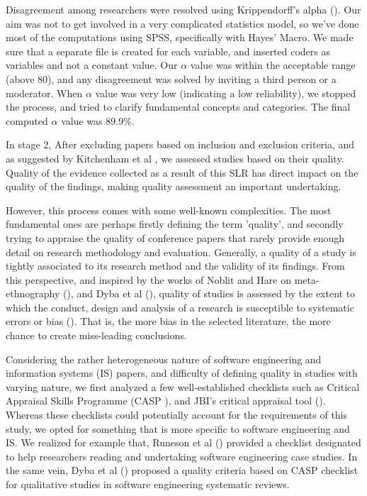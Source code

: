 \documentclass{ieeeaccess}
\begin{document}
Disagreement among researchers were resolved using Krippendorff’s alpha (\cite{krippendorff2011computing}). Our aim was not to get involved in a very complicated statistics model, so we've done most of the computations using SPSS, specifically with Hayes’ Macro. We made sure that a separate file is created for each variable, and inserted coders as variables and not a constant value. Our $ \alpha $ value was within the acceptable range (above 80), and any disagreement was solved by inviting a third person or a moderator. When $ \alpha $ value was very low (indicating a low reliability), we stopped the process, and tried to clarify fundamental concepts and categories. The final computed $ \alpha $ value was 89.9\%. 

In stage 2, After excluding papers based on inclusion and exclusion criteria, and as suggested by Kitchenham et al \cite{kitchenham2015evidence}, we assessed studies based on their quality. Quality of the evidence collected as a result of this SLR has direct impact on the quality of the findings, making quality assessment an important undertaking.

However, this process comes with some well-known complexities. The most fundamental ones are perhaps firstly defining the term 'quality', and secondly trying to appraise the quality of conference papers that rarely provide enough detail on research methodology and evaluation. Generally, a quality of a study is tightly associated to its research method and the validity of its findings. From this perspective, and inspired by the works of Noblit and Hare on meta-ethnography (\cite{noblit1988meta}), and Dyba et al (\cite{dybaa2008empirical}), quality of studies is assessed by the extent to which the conduct, design and analysis of a research is susceptible to systematic errors or bias (\cite{cumpston2019updated}). That is, the more bias in the selected literature, the more chance to create miss-leading conclusions.

Considering the rather heterogeneous nature of software engineering and information systems (IS) papers, and difficulty of defining quality in studies with varying nature, we first analyzed a few well-established checklists such as Critical Appraisal Skills Programme (CASP \cite{CASP}), and JBI's critical appraisal tool (\cite{JBI}). Whereas these checklists could potentially account for the requirements of this study, we opted for something that is more specific to software engineering and IS. We realized for example that, Runeson et al (\cite{runeson2006we}) provided a checklist designated to help researchers reading and undertaking software engineering case studies. In the same vein, Dyba et al (\cite{dybaa2008empirical}) proposed a quality criteria based on CASP checklist for qualitative studies in software engineering systematic reviews. 
\end{document}
